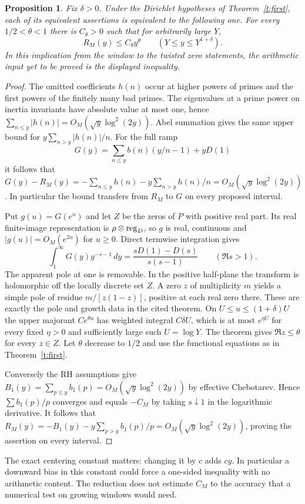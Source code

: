 \documentclass[11pt]{article}
\newtheorem{proposition}[theorem]{Proposition}
\begin{document}
\begin{proposition}\label{p:window}
Fix $\delta>0$. Under the Dirichlet hypotheses of Theorem~\ref{t:first},
each of its equivalent assertions is equivalent to the following one.
For every $1/2<\theta<1$ there is $C_\theta>0$ such that for
arbitrarily large $Y$,
\[
                  R_M(y)\le C_\theta y^\theta
                  \qquad(Y\le y\le Y^{1+\delta}).
\]
In this implication from the window to the twisted zero statements,
the arithmetic input yet to be proved is the displayed inequality.
\end{proposition}
\begin{proof}
The omitted coefficients $h(n)$ occur at higher powers of primes and
the first powers of the finitely many bad primes. The eigenvalues at
a prime power on inertia invariants have absolute value at most one,
hence $\sum_{n\le y}|h(n)|=O_M(\sqrt{y}\log^2(2y))$.
Abel summation gives the same upper bound for
$y\sum_{n>y}|h(n)|/n$. For the full ramp
\[
 G(y)=\sum_{n\le y}b(n)(y/n-1)+yD(1)
\]
it follows that $G(y)-R_M(y)=-\sum_{n\le y}h(n)-y\sum_{n>y}h(n)/n
=O_M(\sqrt{y}\log^2(2y))$. In particular the bound transfers from
$R_M$ to $G$ on every proposed interval.

Put $g(u)=G(e^u)$ and let $Z$ be the zeros of $P$ with positive real
part. Its real finite-image representation is
$\rho\otimes{\rm reg}_D$, so $g$ is real, continuous and
$|g(u)|=O_M(e^{2u})$ for $u\ge0$. Direct termwise integration gives
\[
\int_1^\infty G(y)y^{-s-1}\,dy
     =\frac{sD(1)-D(s)}{s(s-1)}\qquad(\Re s>1).
\]
The apparent pole at one is removable. In the positive half-plane
the transform is holomorphic off the locally discrete set $Z$.
A zero $z$ of multiplicity $m$ yields a simple pole of residue
$m/[z(1-z)]$, positive at each real zero there. These are exactly
the pole and growth data in the cited theorem. On $U\le u\le(1+\delta)U$
the upper majorant $C e^{\theta u}$ has weighted integral $C\delta U$,
which is at most $e^{\eta U}$ for every fixed $\eta>0$ and sufficiently
large such $U=\log Y$. The theorem gives $\Re z\le\theta$ for every
$z\in Z$. Let $\theta$ decrease to $1/2$ and use the functional equations
as in Theorem~\ref{t:first}.

Conversely the RH assumptions give
$B_1(y)=\sum_{p\le y}b_1(p)=O_M(\sqrt{y}\log^2(2y))$ by effective
Chebotarev. Hence $\sum b_1(p)/p$ converges and equals $-C_M$
by taking $s\downarrow1$ in the logarithmic derivative. It follows
that $R_M(y)=-B_1(y)-y\sum_{p>y}b_1(p)/p
=O_M(\sqrt{y}\log^2(2y))$, proving the assertion on every interval.
\end{proof}
The exact centering constant matters: changing it by $c$ adds $cy$.
In particular a downward bias in this constant could force a one-sided
inequality with no arithmetic content. The reduction does not estimate
$C_M$ to the accuracy that a numerical test on growing windows would need.
\end{document}
